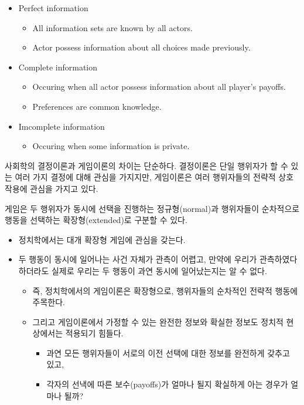 \documentclass[]{book}
\providecommand{\tightlist}{%
  \setlength{\itemsep}{0pt}\setlength{\parskip}{0pt}}
\begin{document}
\begin{itemize}
\item
  Perfect information

  \begin{itemize}
  \tightlist
  \item
    All information sets are known by all actors.
  \item
    Actor possess information about all choices made previously.
  \end{itemize}
\item
  Complete information

  \begin{itemize}
  \tightlist
  \item
    Occuring when all actor possess information about all player's payoffs.
  \item
    Preferences are common knowledge.
  \end{itemize}
\item
  Imcomplete information

  \begin{itemize}
  \tightlist
  \item
    Occuring when some information is private.
  \end{itemize}
\end{itemize}

사회학의 결정이론과 게임이론의 차이는 단순하다. 결정이론은 단일 행위자가 할 수 있는 여러 가지 결정에 대해 관심을 가지지만, 게임이론은 여러 행위자들의 전략적 상호작용에 관심을 가지고 있다.

게임은 두 행위자가 동시에 선택을 진행하는 정규형(normal)과 행위자들이 순차적으로 행동을 선택하는 확장형(extended)로 구분할 수 있다.

\begin{itemize}
\item
  정치학에서는 대개 확장형 게임에 관심을 갖는다.
\item
  두 행동이 동시에 일어나는 사건 자체가 관측이 어렵고, 만약에 우리가 관측하였다 하더라도 실제로 우리는 두 행동이 과연 동시에 일어났는지는 알 수 없다.

  \begin{itemize}
  \item
    즉, 정치학에서의 게임이론은 확장형으로, 행위자들의 순차적인 전략적 행동에 주목한다.
  \item
    그리고 게임이론에서 가정할 수 있는 완전한 정보와 확실한 정보도 정치적 현상에서는 적용되기 힘들다.

    \begin{itemize}
    \tightlist
    \item
      과연 모든 행위자들이 서로의 이전 선택에 대한 정보를 완전하게 갖추고 있고,
    \item
      각자의 선낵에 따른 보수(payoffs)가 얼마나 될지 확실하게 아는 경우가 얼마나 될까?
    \end{itemize}
  \end{itemize}
\end{itemize}
\end{document}
